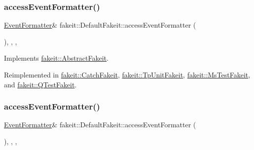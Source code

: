 \subsubsection{\texorpdfstring{accessEventFormatter()}{accessEventFormatter()}\hspace{0.1cm}{\footnotesize\ttfamily [1/9]}}
{\footnotesize\ttfamily \mbox{\hyperlink{structfakeit_1_1EventFormatter}{Event\+Formatter}}\& fakeit\+::\+Default\+Fakeit\+::access\+Event\+Formatter (\begin{DoxyParamCaption}{ }\end{DoxyParamCaption})\hspace{0.3cm}{\ttfamily [inline]}, {\ttfamily [override]}, {\ttfamily [protected]}, {\ttfamily [virtual]}}



Implements \mbox{\hyperlink{classfakeit_1_1AbstractFakeit_a443a7ac12208c55f2ae4fa072e983476}{fakeit\+::\+Abstract\+Fakeit}}.



Reimplemented in \mbox{\hyperlink{classfakeit_1_1CatchFakeit_aaadf534923d2255186e3a13446828b05}{fakeit\+::\+Catch\+Fakeit}}, \mbox{\hyperlink{classfakeit_1_1TpUnitFakeit_ae0f3713842b30e36ee1b0ce03a070b59}{fakeit\+::\+Tp\+Unit\+Fakeit}}, \mbox{\hyperlink{classfakeit_1_1MsTestFakeit_ad4e89ab859aa132a1f35fc0fea7d05a2}{fakeit\+::\+Ms\+Test\+Fakeit}}, and \mbox{\hyperlink{classfakeit_1_1QTestFakeit_a3760d57c61ed1572bcf5cded00f643ec}{fakeit\+::\+Q\+Test\+Fakeit}}.

\mbox{\label{classfakeit_1_1DefaultFakeit_a02cb8f08a94e7bf830c87f74f20c9bd9}} 
\subsubsection{\texorpdfstring{accessEventFormatter()}{accessEventFormatter()}\hspace{0.1cm}{\footnotesize\ttfamily [2/9]}}
{\footnotesize\ttfamily \mbox{\hyperlink{structfakeit_1_1EventFormatter}{Event\+Formatter}}\& fakeit\+::\+Default\+Fakeit\+::access\+Event\+Formatter (\begin{DoxyParamCaption}{ }\end{DoxyParamCaption})\hspace{0.3cm}{\ttfamily [inline]}, {\ttfamily [override]}, {\ttfamily [protected]}, {\ttfamily [virtual]}}



